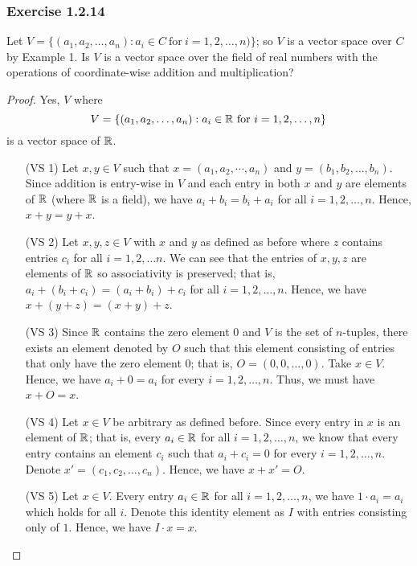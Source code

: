 \subsubsection{Exercise 1.2.14} Let \( V = \{ (a_{1}, a_{2}, \dots, a_{n} )  : a_{i} \in C  \ \text{for} \  i = 1,2, \dots, n) \}  \); so \( V  \) is a vector space over \( C   \) by Example 1.  Is \( V  \) is a vector space over the field of real numbers with the operations of coordinate-wise addition and multiplication?

\begin{proof}
Yes, \( V  \) where 
\[  V = \{ (a_{1}, a_{2}, \dots , a_{n} ): a_{i} \in \mathbb{R} \ \text{for} \  i = 1,2, \dots, n  \}  \] is a vector space of \( \mathbb{R}  \).
\begin{enumerate}
    \item[(VS 1)] Let \( x,y \in V  \) such that \( x = (a_{1}, a_{2} , \dotsm,  a_{n}) \) and \( y = (b_1, b_2, \dots, b_n)  \). Since addition is entry-wise in \( V  \) and each entry in both \( x  \) and \( y  \) are elements of \( \mathbb{R}  \) (where \( \mathbb{R}  \)  is a field), we have \( a_{i} + b_{i} = b_{i} + a_{i}   \) for all \( i = 1,2, \dots, n  \). Hence, \( x + y = y + x  \).
    \item[(VS 2)] Let \( x,y,z \in V  \) with \( x \) and \( y  \) as defined as before where \( z  \) contains entries \( c_{i}  \) for all \( i = 1,2, \dots n  \). We can see that the entries of \( x,y,z \) are elements of \( \mathbb{R}  \) so associativity is preserved; that is, \( a_{i} + ( b_{i} + c_{i}  )  = ( a_{i}  + b_{i} ) + c_{i}   \)  for all \( i = 1,2, \dots , n \). Hence, we have \( x + (y + z) = (x+ y) + z   \).
    \item[(VS 3)] Since \( \mathbb{R}  \) contains the zero element \( 0  \) and \( V  \) is the set of \( n  \)-tuples, there exists an element denoted by \( O  \) such that this element consisting of entries that only have the zero element \( 0  \); that is, \( O = (0, 0 , \dots, 0 ) \). Take \( x \in V  \). Hence, we have \( a_{i} + 0 = a_{i}  \) for every \( i = 1,2, \dots, n  \). Thus, we must have \( x + O = x  \). 
    \item[(VS 4)] Let \( x \in V  \) be arbitrary as defined before. Since every entry in \( x  \) is an element of \( \mathbb{R}  \); that is, every \( a_{i} \in \mathbb{R}   \) for all \( i = 1,2, \dots, n  \), we know that every entry contains an element \( c_{i}  \) such that \( a_{i} + c_{i} = 0   \) for every \( i = 1,2,\dots, n  \). Denote \( x' = (c_{1}, c_{2}, \dots, c_{n})  \). Hence, we have \( x + x' = O  \). 
    \item[(VS 5)] Let \( x \in V  \). Every entry \( a_{i} \in \mathbb{R}   \) for all \( i = 1,2, \dots, n  \), we have \( 1 \cdot a_{i} = a_{i} \) which holds for all \( i  \). Denote this identity element as \( I  \) with entries  consisting only of \( 1 \). Hence, we have \( I \cdot x = x  \).

\end{enumerate}
\end{proof}
